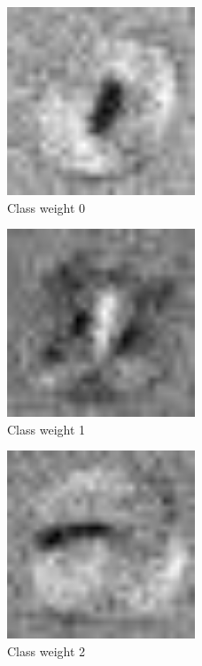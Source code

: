 \begin{figure}[]
    \centering
    \includegraphics[width=0.50\textwidth]{figures/weights/class_0_weight_image.jpg}
    \caption{Class weight 0}
    \label{fig:class_weight_0}
\end{figure}

\begin{figure}[]
    \centering
    \includegraphics[width=0.50\textwidth]{figures/weights/class_1_weight_image.jpg}
    \caption{Class weight 1}
    \label{fig:class_weight_1}
\end{figure}

\begin{figure}[]
    \centering
    \includegraphics[width=0.50\textwidth]{figures/weights/class_2_weight_image.jpg}
    \caption{Class weight 2}
    \label{fig:class_weight_2}
\end{figure}

